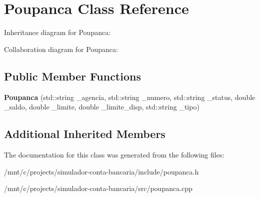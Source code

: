 \hypertarget{classPoupanca}{}\section{Poupanca Class Reference}
\label{classPoupanca}


Inheritance diagram for Poupanca\+:


Collaboration diagram for Poupanca\+:
\subsection*{Public Member Functions}
\begin{DoxyCompactItemize}
\item 
\mbox{\label{classPoupanca_aff5ddca5bb1298eb98f5b0f961eaf784}} 
{\bfseries Poupanca} (std\+::string \+\_\+agencia, std\+::string \+\_\+numero, std\+::string \+\_\+status, double \+\_\+saldo, double \+\_\+limite, double \+\_\+limite\+\_\+disp, std\+::string \+\_\+tipo)
\end{DoxyCompactItemize}
\subsection*{Additional Inherited Members}


The documentation for this class was generated from the following files\+:\begin{DoxyCompactItemize}
\item 
/mnt/c/projects/simulador-\/conta-\/bancaria/include/poupanca.\+h\item 
/mnt/c/projects/simulador-\/conta-\/bancaria/src/poupanca.\+cpp\end{DoxyCompactItemize}
